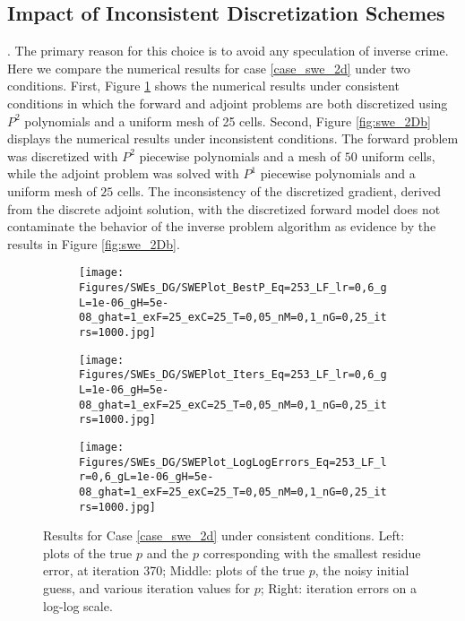 \subsection{Impact of Inconsistent Discretization Schemes}
. The primary reason for this choice is to avoid any speculation of inverse crime. Here we compare the numerical results for case \eqref{case_swe_2d} under two conditions. First, Figure \ref{fig:swe_6A} shows the numerical results under consistent conditions in which the forward and adjoint problems are both discretized using $P^2$ polynomials and a uniform mesh of 25 cells. Second, Figure \ref{fig:swe_2Db} displays the numerical results under inconsistent conditions. The forward problem was discretized with $P^2$ piecewise polynomials and a mesh of $50$ uniform cells, while the adjoint problem was solved with $P^1$ piecewise polynomials and a uniform mesh of $25$ cells. The inconsistency of the discretized gradient, derived from the discrete adjoint solution, with the discretized forward model does not contaminate the behavior of the inverse problem algorithm as evidence by the results in Figure \ref{fig:swe_2Db}. 

\begin{figure}[h]
    \begin{subfigure}[t]{0.32\textwidth}
        \centering
        \texttt{[image: Figures/SWEs\_DG/SWEPlot\_BestP\_Eq=253\_LF\_lr=0,6\_gL=1e-06\_gH=5e-08\_ghat=1\_exF=25\_exC=25\_T=0,05\_nM=0,1\_nG=0,25\_itrs=1000.jpg]}
    \end{subfigure}
    \begin{subfigure}[t]{0.32\textwidth}
        \centering
        \texttt{[image: Figures/SWEs\_DG/SWEPlot\_Iters\_Eq=253\_LF\_lr=0,6\_gL=1e-06\_gH=5e-08\_ghat=1\_exF=25\_exC=25\_T=0,05\_nM=0,1\_nG=0,25\_itrs=1000.jpg]}
    \end{subfigure}
    \begin{subfigure}[t]{0.32\textwidth}
        \texttt{[image: Figures/SWEs\_DG/SWEPlot\_LogLogErrors\_Eq=253\_LF\_lr=0,6\_gL=1e-06\_gH=5e-08\_ghat=1\_exF=25\_exC=25\_T=0,05\_nM=0,1\_nG=0,25\_itrs=1000.jpg]}
    \end{subfigure}
    \caption{Results for Case \eqref{case_swe_2d} under consistent conditions. Left: plots of the true $p$ and the $p$ corresponding with the smallest residue error, at iteration 370; Middle: plots of the true $p$, the noisy initial guess, and various iteration values for $p$; Right: iteration errors on a log-log scale.}
    \label{fig:swe_6A}
\end{figure}

